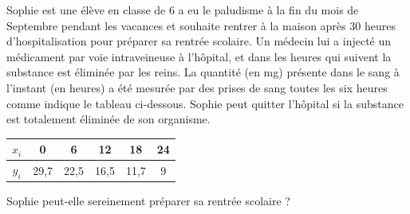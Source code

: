 
\everymath{\displaystyle}





\begin{exercice}
	Sophie est une élève en classe de 6 a eu le paludisme à la fin du mois de Septembre pendant les vacances et souhaite rentrer à la maison après 30 heures d'hospitalisation pour préparer sa rentrée scolaire. Un médecin lui a injecté un médicament par voie intraveineuse à l'hôpital, et dans les heures qui suivent la substance est éliminée par les reins. La quantité (en mg)  présente dans le sang à l'instant  (en heures) a été mesurée par des prises de sang toutes les six heures comme indique le tableau ci-dessous. Sophie peut quitter l'hôpital si la substance est totalement éliminée de son organisme.
\begin{center}\vspace*{-0.5em}
\renewcommand{\arraystretch}{1.5}
\begin{tabular}{|c|c|c|c|c|c|}
\hline
   $ x_i $   & 0 & 6 &  12&  18&  24 \\
\hline
 $ y_i $   & 29,7 & 22,5 & 16,5 & 11,7 & 9  \\
\hline
\end{tabular}
\end{center}


Sophie  peut-elle sereinement préparer sa rentrée scolaire ?  
\end{exercice}

